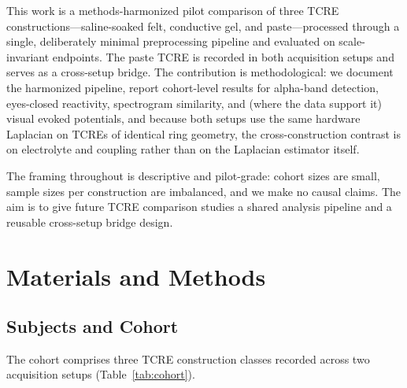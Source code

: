 \documentclass[10pt,a4paper]{article}
\begin{document}
This work is a methods-harmonized pilot comparison of three TCRE constructions---saline-soaked felt, conductive gel, and paste---processed through a single, deliberately minimal preprocessing pipeline and evaluated on scale-invariant endpoints. The paste TCRE is recorded in both acquisition setups and serves as a cross-setup bridge. The contribution is methodological: we document the harmonized pipeline, report cohort-level results for alpha-band detection, eyes-closed reactivity, spectrogram similarity, and (where the data support it) visual evoked potentials, and because both setups use the same hardware Laplacian on TCREs of identical ring geometry, the cross-construction contrast is on electrolyte and coupling rather than on the Laplacian estimator itself.

The framing throughout is descriptive and pilot-grade: cohort sizes are small, sample sizes per construction are imbalanced, and we make no causal claims. The aim is to give future TCRE comparison studies a shared analysis pipeline and a reusable cross-setup bridge design.

\section{Materials and Methods}

\subsection{Subjects and Cohort}

The cohort comprises three TCRE construction classes recorded across two acquisition setups (Table~\ref{tab:cohort}).
\end{document}
